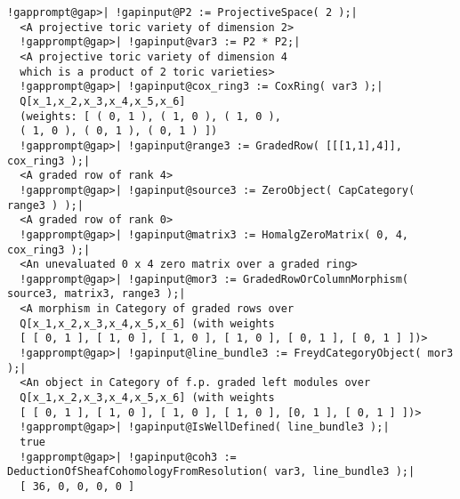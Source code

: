 \documentclass[a4paper,11pt]{report}
\begin{document}
{{\begin{Verbatim}[commandchars=!@|,fontsize=\small,frame=single,label=Example]
  !gapprompt@gap>| !gapinput@P2 := ProjectiveSpace( 2 );|
  <A projective toric variety of dimension 2>
  !gapprompt@gap>| !gapinput@var3 := P2 * P2;|
  <A projective toric variety of dimension 4 
  which is a product of 2 toric varieties>
  !gapprompt@gap>| !gapinput@cox_ring3 := CoxRing( var3 );|
  Q[x_1,x_2,x_3,x_4,x_5,x_6]
  (weights: [ ( 0, 1 ), ( 1, 0 ), ( 1, 0 ), 
  ( 1, 0 ), ( 0, 1 ), ( 0, 1 ) ])
  !gapprompt@gap>| !gapinput@range3 := GradedRow( [[[1,1],4]], cox_ring3 );|
  <A graded row of rank 4>
  !gapprompt@gap>| !gapinput@source3 := ZeroObject( CapCategory( range3 ) );|
  <A graded row of rank 0>
  !gapprompt@gap>| !gapinput@matrix3 := HomalgZeroMatrix( 0, 4, cox_ring3 );|
  <An unevaluated 0 x 4 zero matrix over a graded ring>
  !gapprompt@gap>| !gapinput@mor3 := GradedRowOrColumnMorphism( source3, matrix3, range3 );|
  <A morphism in Category of graded rows over
  Q[x_1,x_2,x_3,x_4,x_5,x_6] (with weights
  [ [ 0, 1 ], [ 1, 0 ], [ 1, 0 ], [ 1, 0 ], [ 0, 1 ], [ 0, 1 ] ])>
  !gapprompt@gap>| !gapinput@line_bundle3 := FreydCategoryObject( mor3 );|
  <An object in Category of f.p. graded left modules over 
  Q[x_1,x_2,x_3,x_4,x_5,x_6] (with weights 
  [ [ 0, 1 ], [ 1, 0 ], [ 1, 0 ], [ 1, 0 ], [0, 1 ], [ 0, 1 ] ])>
  !gapprompt@gap>| !gapinput@IsWellDefined( line_bundle3 );|
  true
  !gapprompt@gap>| !gapinput@coh3 := DeductionOfSheafCohomologyFromResolution( var3, line_bundle3 );|
  [ 36, 0, 0, 0, 0 ]
\end{Verbatim}
 }

 }

   
\end{document}
